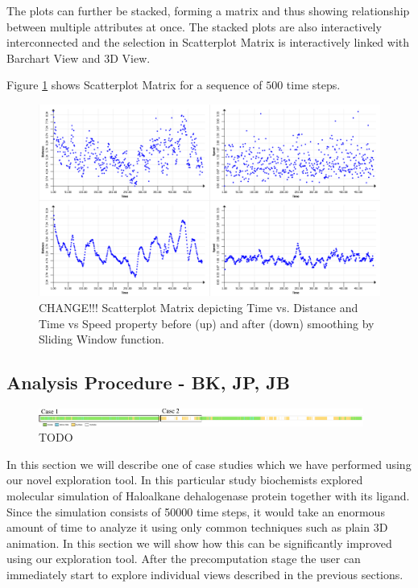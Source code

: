 \documentclass[twocolumn]{bmcart}%
\begin{document}
The plots can further be stacked, forming a matrix and thus showing relationship between multiple attributes at once.
The stacked plots are also interactively interconnected and the selection in Scatterplot Matrix is interactively linked with Barchart View and 3D View.

Figure \ref{fig:scatterplot} shows Scatterplot Matrix for a sequence of $500$ time steps.

\begin{figure}[htb]
	\centering
  \includegraphics[width=0.95\linewidth]{img/scatterplot.png}
  \caption{\label{fig:scatterplot} CHANGE!!! Scatterplot Matrix depicting Time vs. Distance and Time vs Speed property before (up) and after (down) smoothing by Sliding Window function.}
\end{figure}

\subsection*{Analysis Procedure - BK, JP, JB}

\begin{figure}[htb]
	\centering
  \includegraphics[width=0.95\textwidth]{img/case_overview.pdf}
  \caption{\label{fig:case_overview} {\color{red}TODO}}
\end{figure}

In this section we will describe one of case studies which we have performed using our novel exploration tool.
In this particular study biochemists explored molecular simulation of Haloalkane dehalogenase protein together with its ligand. 
Since the simulation consists of 50000 time steps, it would take an enormous amount of time to analyze it using only common techniques such as plain 3D animation.
In this section we will show how this can be significantly improved using our exploration tool.
After the precomputation stage the user can immediately start to explore individual views described in the previous sections.
\end{document}
